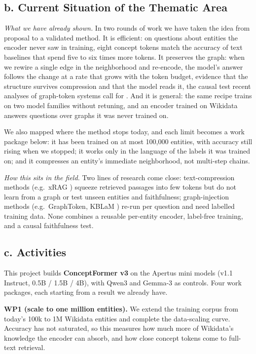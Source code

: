 \documentclass[11pt,a4paper]{article}
\begin{document}
\subsection*{b. Current Situation of the Thematic Area}
\emph{What we have already shown.} In two rounds of work we have taken the idea from proposal to a
validated method. It is efficient: on questions about entities the encoder never saw in
training, eight concept tokens match the accuracy of text baselines that spend five to six times
more tokens. It preserves the graph: when we rewire a single edge in the neighborhood and
re-encode, the model's answer follows the change at a rate that grows with the token budget,
evidence that the structure survives compression and that the model reads it, the causal test
recent analyses of graph-token systems call for \cite{gteval}. And it is general: the same
recipe trains on two model families without retuning, and an encoder trained on Wikidata answers
questions over graphs it was never trained on.

We also mapped where the method stops today, and each limit becomes a work package below: it has
been trained on at most 100{,}000 entities, with accuracy still rising when we stopped; it works
only in the language of the labels it was trained on; and it compresses an entity's immediate
neighborhood, not multi-step chains.

\emph{How this sits in the field.} Two lines of research come close: text-compression methods
(e.g.\ xRAG \cite{xrag}) squeeze retrieved passages into few tokens but do not learn from a graph
or test unseen entities and faithfulness; graph-injection methods (e.g.\ GraphToken, KBLaM
\cite{graphtoken,kblam}) re-run per question and need labelled training data. None combines a
reusable per-entity encoder, label-free training, and a causal faithfulness test.

\subsection*{c. Activities}
This project builds \textbf{ConceptFormer v3} on the Apertus mini models (v1.1 Instruct, 0.5B /
1.5B / 4B), with Qwen3 and Gemma-3 as controls. Four work packages, each starting from a result we
already have.

\textbf{WP1 (scale to one million entities).} We extend the training corpus from today's 100k to
1M Wikidata entities and complete the data-scaling curve. Accuracy has not saturated, so this
measures how much more of Wikidata's knowledge the encoder can absorb, and how close concept
tokens come to full-text retrieval.
\end{document}

